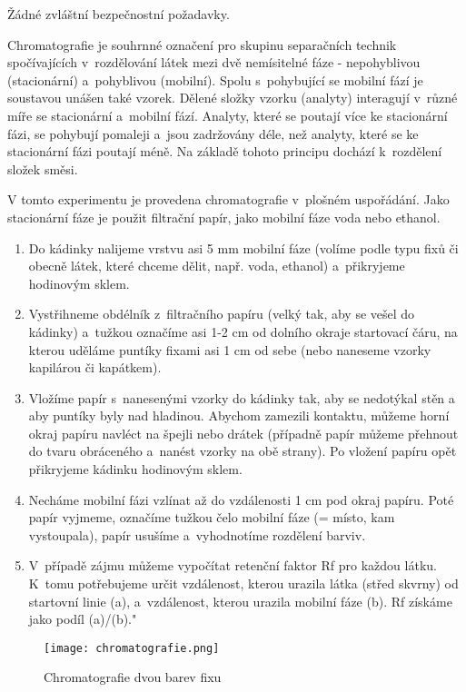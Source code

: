 \hspace{-21pt} 

Žádné zvláštní bezpečnostní požadavky.\\

\hspace{-21pt} 

Chromatografie je souhrnné označení pro skupinu separačních technik spočívajících v~rozdělování látek mezi dvě nemísitelné fáze - nepohyblivou (stacionární) a~pohyblivou (mobilní). Spolu s~pohybující se mobilní fází je soustavou unášen také vzorek. Dělené složky vzorku (analyty) interagují v~různé míře se stacionární a~mobilní fází. Analyty, které se poutají více ke stacionární fázi, se pohybují pomaleji a~jsou zadržovány déle, než analyty, které se ke stacionární fázi poutají méně. Na základě tohoto principu dochází k~rozdělení složek směsi.

V tomto experimentu je provedena chromatografie v~plošném uspořádání. Jako stacionární fáze je použit filtrační papír, jako mobilní fáze voda nebo ethanol. \newline

\hspace{-21pt} 

\begin{enumerate}
\item Do kádinky nalijeme vrstvu asi 5 mm mobilní fáze (volíme podle typu fixů či obecně látek, které chceme dělit, např. voda, ethanol) a~přikryjeme hodinovým sklem.
\item Vystřihneme obdélník z~filtračního papíru (velký tak, aby se vešel do kádinky) a~tužkou označíme asi 1-2 cm od dolního okraje startovací čáru, na kterou uděláme puntíky fixami asi 1 cm od sebe (nebo naneseme vzorky kapilárou či kapátkem).
\item Vložíme papír s~nanesenými vzorky do kádinky tak, aby se nedotýkal stěn a aby puntíky byly nad hladinou.  Abychom zamezili kontaktu, můžeme horní okraj papíru navléct na špejli nebo drátek (případně papír můžeme přehnout do tvaru obráceného  a~nanést vzorky na obě strany). Po vložení papíru opět přikryjeme kádinku hodinovým sklem.
\item Necháme mobilní fázi vzlínat až do vzdálenosti 1 cm pod okraj papíru. Poté papír vyjmeme, označíme tužkou čelo mobilní fáze (= místo, kam vystoupala), papír usušíme a~vyhodnotíme rozdělení barviv.
\item V~případě zájmu můžeme vypočítat retenční faktor Rf pro každou látku. K~tomu potřebujeme určit vzdálenost, kterou urazila látka (střed skvrny) od startovní linie (a), a~vzdálenost, kterou urazila mobilní fáze (b). Rf získáme jako podíl (a)/(b)."
\end{enumerate}

\begin{figure}[h]
    \centering
    \texttt{[image: chromatografie.png]}
    \caption{Chromatografie dvou barev fixu}
\end{figure}
